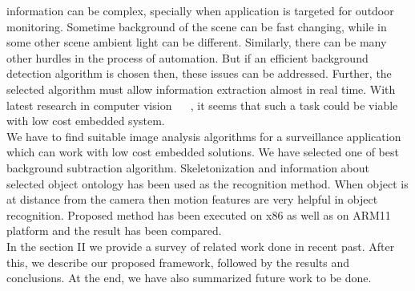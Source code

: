 \documentclass[conference]{IEEEtran}
\begin{document}
information can be complex, specially when application is targeted for
outdoor monitoring. Sometime background of the scene can be fast
changing, while in some other scene ambient light can be different.
Similarly, there can be many other hurdles in the process of automation.
But if an efficient background detection algorithm is chosen then, these
issues can be addressed. Further, the selected algorithm must allow
information extraction almost in real time. With latest research in
computer vision ~\cite{3} ~\cite{5}, it seems that such a task could be
viable with low cost embedded system.\\
\indent We have to find suitable image analysis algorithms for a
surveillance application which can work with low cost embedded solutions.
We have selected one of best ~\cite{5} background subtraction algorithm.
Skeletonization and information about selected object ontology
has been used as the recognition method. When object is at distance from
the camera then motion features are very helpful in object recognition.
Proposed method has been executed on x86 as well as on ARM11 platform
and the result has been compared. \\
\indent In the  section II we provide a survey of related work done in
recent past. After this, we describe our proposed framework, followed by
the results and conclusions.  At the end, we have also summarized future
work to be done.
\end{document}
